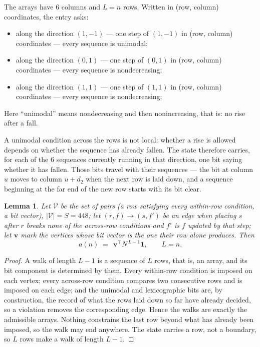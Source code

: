 \documentclass[11pt,a4paper]{article}
\theoremstyle{plain}
\newtheorem{lemma}[theorem]{Lemma}
\theoremstyle{definition}
\begin{document}
The arrays have $6$ columns and $L=n$ rows. Written in (row, column)
coordinates, the entry asks:
\begin{itemize}
\item along the direction $(1,-1)$ --- one step of $(1,-1)$ in (row, column) coordinates --- every sequence is unimodal;
\item along the direction $(0,1)$ --- one step of $(0,1)$ in (row, column) coordinates --- every sequence is nondecreasing;
\item along the direction $(1,1)$ --- one step of $(1,1)$ in (row, column) coordinates --- every sequence is nondecreasing;
\end{itemize}
Here ``unimodal'' means nondecreasing and then nonincreasing, that is: no rise after a fall.

A unimodal condition across the rows is not local: whether a
rise is allowed depends on whether the sequence has already fallen. The state therefore
carries, for each of the $6$ sequences currently running in that direction, one bit saying
whether it has fallen. Those bits travel with their sequences --- the bit at column $u$
moves to column $u+d_2$ when the next row is laid down, and a sequence beginning at the
far end of the new row starts with its bit clear.

\begin{lemma}\label{lem:walk}
Let $\mathcal V$ be the set of pairs (a row satisfying every within-row condition, a
bit vector), $|\mathcal V|=S=448$; let $(r,f)\to(s,f')$ be an edge when placing $s$ after $r$
breaks none of the across-row conditions and $f'$ is $f$ updated by that step; let
$\mathbf{v}$ mark the vertices whose bit vector is the one their row alone produces.
Then
\[
a(n)\;=\;\,\mathbf{v}^{\!\top}N^{\,L-1}\mathbf{1},\qquad L=n.
\]
\end{lemma}

\begin{proof}
A walk of length $L-1$ is a sequence of $L$ rows, that is, an array, and its bit component
is determined by them. Every within-row condition is imposed on each vertex; every
across-row condition compares two consecutive rows and is imposed on each edge; and the
unimodal and lexicographic bits are, by construction, the record of what the rows laid down
so far have already decided, so a violation removes the corresponding edge. Hence the walks
are exactly the admissible arrays. Nothing constrains the last row beyond what has already
been imposed, so the walk may end anywhere. The state carries a row, not a boundary, so
$L$ rows make a walk of length $L-1$.
\end{proof}
\end{document}
